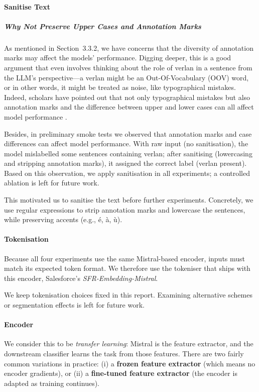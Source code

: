 \documentclass[12pt]{article}
\begin{document}
\paragraph{Sanitise Text}
\subparagraph{Why Not Preserve Upper Cases and Annotation Marks}
As mentioned in Section~3.3.2, we have concerns that the diversity of annotation marks may affect the models' performance. Digging deeper, this is a good argument that even involves thinking about the role of verlan in a sentence from the LLM's perspective\;---\;a verlan might be an Out-Of-Vocabulary (OOV) word, or in other words, it might be treated as noise, like typographical mistakes. Indeed, scholars have pointed out that not only typographical mistakes but also annotation marks and the difference between upper and lower cases can all affect model performance \cite{alsharou2021noise}. 

Besides, in preliminary smoke tests we observed that annotation marks and case differences can affect model performance. With raw input (no sanitisation), the model mislabelled some sentences containing verlan; after sanitising (lowercasing and stripping annotation marks), it assigned the correct label (verlan present). Based on this observation, we apply sanitisation in all experiments; a controlled ablation is left for future work.

This motivated us to sanitise the text before further experiments. Concretely, we use regular expressions to strip annotation marks and lowercase the sentences, while preserving accents (e.g., é, à, ù).

\paragraph{Tokenisation}
Because all four experiments use the same Mistral-based encoder, inputs must match its expected token format. We therefore use the tokeniser that ships with this encoder, Salesforce's \textit{SFR-Embedding-Mistral}.

We keep tokenisation choices fixed in this report. Examining alternative schemes or segmentation effects is left for future work.

\paragraph{Encoder}
We consider this to be \textit{transfer learning}: Mistral is the feature extractor, and the downstream classifier learns the task from those features. There are two fairly common variations in practice: (i) a \textbf{frozen feature extractor} (which means no encoder gradients), or (ii) a \textbf{fine-tuned feature extractor} (the encoder is adapted as training continues).
\end{document}
